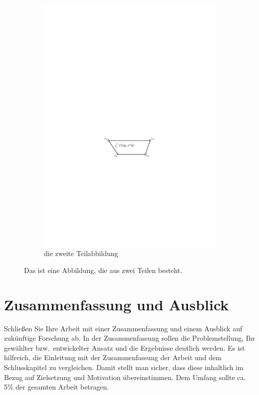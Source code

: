 \documentclass[bachelor,german]{info1thesis}
\begin{document}
\begin{figure}[h]
\begin{subfigure}{.48\textwidth}
  \end{subfigure}
  \hfill
  \begin{subfigure}{.48\textwidth}
    \centering
    \includegraphics[page=2]{abbildungen/trapez}
    \caption{die zweite Teilabbildung}
    \label{fig:trapez-zwei}
  \end{subfigure}
  \caption{Das ist eine Abbildung, die aus zwei Teilen besteht.}
  \label{fig:zwei-trapeze}
\end{figure}


\chapter{Zusammenfassung und Ausblick}
Schließen Sie Ihre Arbeit mit einer Zusammenfassung und einem Ausblick auf zukünftige Forschung ab.
In der Zusammenfassung sollen die Problemstellung, Ihr gewählter bzw.\ entwickelter Ansatz und die Ergebnisse deutlich werden.
Es ist hilfreich, die Einleitung mit der Zusammenfassung der Arbeit und dem Schlusskapitel zu vergleichen. 
Damit stellt man sicher, dass diese inhaltlich im Bezug auf Zielsetzung und Motivation übereinstimmen. Dem Umfang sollte ca.\,5\% der gesamten Arbeit betragen.
\end{document}
